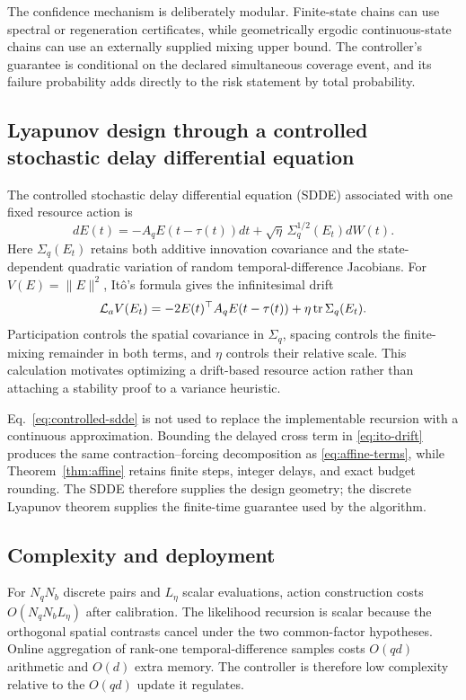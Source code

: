 \documentclass[journal]{IEEEtran}
\newcommand{\tr}{\operatorname{tr}}
\begin{document}
The confidence mechanism is deliberately modular.
Finite-state chains can use spectral or regeneration certificates, while geometrically ergodic continuous-state chains can use an externally supplied mixing upper bound.
The controller's guarantee is conditional on the declared simultaneous coverage event, and its failure probability adds directly to the risk statement by total probability.

\subsection{Lyapunov design through a controlled stochastic delay differential equation}
The controlled stochastic delay differential equation (SDDE) associated with one fixed resource action is
\begin{equation}
dE(t)=-A_qE(t-\tau(t))dt
+\sqrt{\eta}\,\Sigma_q^{1/2}(E_t)dW(t).
\label{eq:controlled-sdde}
\end{equation}
Here $\Sigma_q(E_t)$ retains both additive innovation covariance and the state-dependent quadratic variation of random temporal-difference Jacobians.
For $V(E)=\|E\|^2$, It\^o's formula gives the infinitesimal drift
\begin{equation}
{\cal L}_aV(E_t)
=-2E(t)^\top A_qE(t-\tau(t))
+\eta\tr\Sigma_q(E_t).
\label{eq:ito-drift}
\end{equation}
Participation controls the spatial covariance in $\Sigma_q$, spacing controls the finite-mixing remainder in both terms, and $\eta$ controls their relative scale.
This calculation motivates optimizing a drift-based resource action rather than attaching a stability proof to a variance heuristic.

Eq.~\eqref{eq:controlled-sdde} is not used to replace the implementable recursion with a continuous approximation.
Bounding the delayed cross term in \eqref{eq:ito-drift} produces the same contraction--forcing decomposition as \eqref{eq:affine-terms}, while Theorem~\ref{thm:affine} retains finite steps, integer delays, and exact budget rounding.
The SDDE therefore supplies the design geometry; the discrete Lyapunov theorem supplies the finite-time guarantee used by the algorithm.

\subsection{Complexity and deployment}
For $N_qN_b$ discrete pairs and $L_\eta$ scalar evaluations, action construction costs $O(N_qN_bL_\eta)$ after calibration.
The likelihood recursion is scalar because the orthogonal spatial contrasts cancel under the two common-factor hypotheses.
Online aggregation of rank-one temporal-difference samples costs $O(qd)$ arithmetic and $O(d)$ extra memory.
The controller is therefore low complexity relative to the $O(qd)$ update it regulates.
\end{document}
